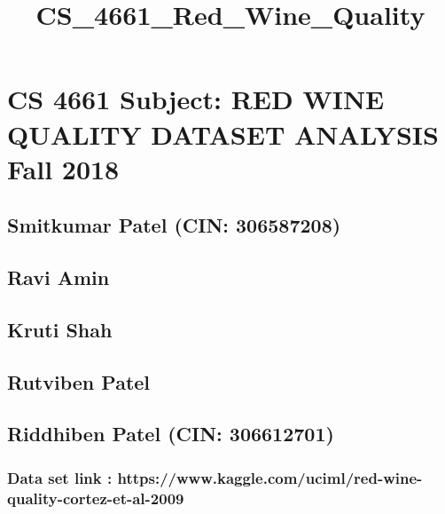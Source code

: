 \documentclass[11pt]{article}
\title{CS\_4661\_Red\_Wine\_Quality}
\begin{document}
    
    
    \maketitle
    
    

    
    \section{CS 4661 \textbar{} Subject: RED WINE QUALITY DATASET ANALYSIS
\textbar{} Fall
2018}\label{cs-4661-subject-red-wine-quality-dataset-analysis-fall-2018}

    \subsection{Smitkumar Patel (CIN:
306587208)}\label{smitkumar-patel-cin-306587208}

\subsection{Ravi Amin}\label{ravi-amin}

\subsection{Kruti Shah}\label{kruti-shah}

\subsection{Rutviben Patel}\label{rutviben-patel}

\subsection{Riddhiben Patel (CIN:
306612701)}\label{riddhiben-patel-cin-306612701}

    \subsubsection{Data set link :
https://www.kaggle.com/uciml/red-wine-quality-cortez-et-al-2009}\label{data-set-link-httpswww.kaggle.comucimlred-wine-quality-cortez-et-al-2009}
\end{document}
